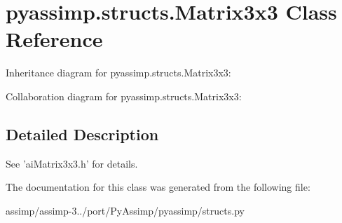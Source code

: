 \hypertarget{classpyassimp_1_1structs_1_1_matrix3x3}{\section{pyassimp.\+structs.\+Matrix3x3 Class Reference}
\label{classpyassimp_1_1structs_1_1_matrix3x3}
}


Inheritance diagram for pyassimp.\+structs.\+Matrix3x3\+:


Collaboration diagram for pyassimp.\+structs.\+Matrix3x3\+:


\subsection{Detailed Description}
\begin{DoxyVerb}See 'aiMatrix3x3.h' for details.
\end{DoxyVerb}
 

The documentation for this class was generated from the following file\+:\begin{DoxyCompactItemize}
\item 
assimp/assimp-\/3../port/\+Py\+Assimp/pyassimp/structs.\+py\end{DoxyCompactItemize}
